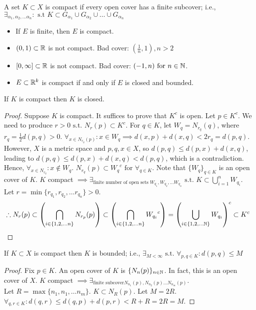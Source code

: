 \begin{definition}[Compact]
	A set $K \subset X$ is compact if every open cover has a finite subcover; i.e., $\exists_{\alpha_1,\alpha_2, \ldots \alpha_n}: \text{ s.t } K \subset G_{\alpha_1} \cup G_{\alpha_2} \cup \ldots  \cup G_{\alpha_n}$
\end{definition}
\begin{example}\hfill
	\begin{itemize}
		\item If $E$ is finite, then $E$ is compact.
		\item $(0,1) \subset \mathbb{R} $ is not compact. Bad cover: $(\frac{1}{n},1), n>2$
		\item $[0, \infty ] \subset \mathbb{R} $ is not compact. Bad cover: $(-1,n) \text{ for } n \in \mathbb{N}$.
		\item $E \subset \mathbb{R}^{k}$ is compact if and only if $E$ is closed and bounded.
	\end{itemize}
\end{example}
\begin{thm}[34]
	If $K$ is compact then $K$ is closed.
	\begin{proof}
		Suppose $K$ is compact. It suffices to prove that $K^{c}$ is open. Let $ p \in K ^{c}$. We need to produce $r>0 \text{ s.t. } N_r(p) \subset K^{c}$.
		For $q \in K$, let $W_q=N_{r_q}(q)$, where $r_q=\frac{1}{2}d(p,q)>0$.
		$\forall_{x \in N_{r_q}\left(p\right)}: x \in W_q \implies d(x,p)+d(x,q)<2r_q=d(p,q)$. However, $X$ is a metric space and $p,q,x \in X$, so $d(p,q) \le d(p,x)+d(x,q)$, leading to $d(p,q)\le d(p,x)+d(x,q)<d(p,q)$, which is a contradiction.
		Hence, $\forall_{x \in N_{r_q}}: x \not\in W_q$.
		$N_{r_{q}}(p) \subset {W_q}^{c} \text{ for } \forall_{q \in K}$.
		Note that $\{W_q\}_{q \in K} $ is an open cover of $K$.
		$K$ compact $\implies \exists_{\text{finite number of open sets } W_{q_1},W_{q_2}, \ldots W_{q_n}} \text{ s.t. }  K \subset \bigcup_{i=1}^{n}{W_{q_i}}$. Let $r= \min\{r_{q_1},r_{q_2}, \ldots r_{q_n}\}>0$.
		\[
			\therefore {N_r}(p) \subset  \left(\bigcap_{i \in \{1,2, \ldots n\} } N_{r_p}(p)\right)  \subset  \left(\bigcap_{i \in  \{1,2,\ldots n\}} {W_{q_i}}^{c}\right)=\left(\bigcup_{i \in \{1,2,\ldots \mathbb{N} \}}W_{q_i}\right)^{c} \subset K^{c}
		\]
	\end{proof}
\end{thm}
\begin{thm}
	If $K \subset X$ is compact then $K$ is bounded; i.e., $\exists_{M< \infty } \text{ s.t. }  \forall_{p,q \in K}: d(p,q) \le M$
	\begin{proof}
		Fix $p \in K$. An open cover of $K$ is $\{N_n(p)\}_{n \in \mathbb{N} }$. In fact, this is an open cover of $X$.
		$K \text{ compact }\implies \exists_{\text{finite subcover} N_{n_1}(p),N_{n_2}(p) \ldots N_{n_m}(p)}$.\\
		Let $R = \max\{n_1,n_1,\ldots n_m\} $. $K \subset N_{R}(p)$. Let $M=2R$. $\forall_{q,r \in K}: d(q,r)\le d(q,p)+d(p,r)<R+R=2R=M$.
	\end{proof}
\end{thm}
